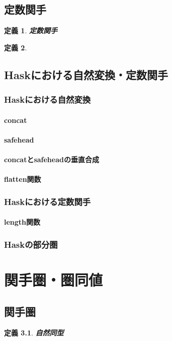 \documentclass{jsbook}
\theoremstyle{plain}
\newtheorem{Def}{定義}[chapter]
\begin{document}
\section{定数関手}
\begin{Def}
{\bf 定数関手}
\end{Def}
\begin{Def}
\end{Def}
\section{Haskにおける自然変換・定数関手}
\subsection{Haskにおける自然変換}
\subsubsection{concat}
\subsubsection{safehead}
\subsubsection{concatとsafeheadの垂直合成}
\subsubsection{flatten関数}
\subsection{Haskにおける定数関手}
\subsubsection{length関数}
\subsection{Haskの部分圏}
\chapter{関手圏・圏同値}
\section{関手圏}
\begin{Def}
\bf{自然同型}
\end{Def}
\end{document}
